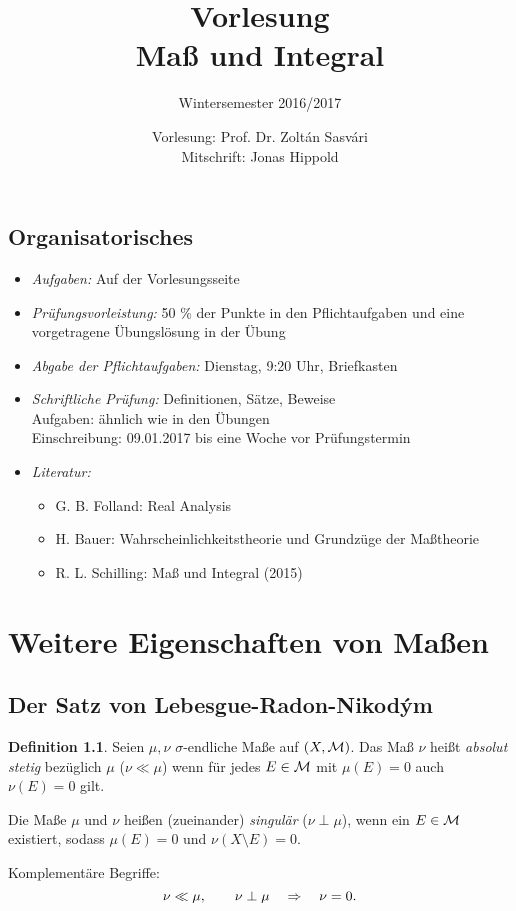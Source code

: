 \documentclass[
 a4paper,
 12pt,
 parskip=half
 ]{scrreprt}
\title{Vorlesung\\Maß und Integral}
\subtitle{Wintersemester 2016/2017}
\author{Vorlesung: Prof. Dr. Zoltán Sasvári\\Mitschrift: Jonas Hippold}
\theoremstyle{plain}
\theoremstyle{definition}
\newtheorem{defn}[thm]{Definition}
\numberwithin{equation}{section}
\begin{document}
\maketitle

\tableofcontents

\clearpage

\section*{Organisatorisches}
 \begin{itemize}
  \item \emph{Aufgaben:} Auf der Vorlesungsseite
  \item \emph{Prüfungsvorleistung:} 50 \% der Punkte in den Pflichtaufgaben und eine vorgetragene Übungslösung in der Übung
  \item \emph{Abgabe der Pflichtaufgaben:} Dienstag, 9:20 Uhr, Briefkasten 
  \item \emph{Schriftliche Prüfung:} Definitionen, Sätze, Beweise \\
   Aufgaben: ähnlich wie in den Übungen \\
   Einschreibung: 09.01.2017 bis eine Woche vor Prüfungstermin
  \item \emph{Literatur:}
   \begin{itemize}
    \item G. B. Folland: Real Analysis
    \item H. Bauer: Wahrscheinlichkeitstheorie und Grundzüge der Maßtheorie
    \item R. L. Schilling: Maß und Integral (2015)
   \end{itemize}
 \end{itemize}



\clearpage



\clearpage

\chapter{Weitere Eigenschaften von Maßen}
\section{Der Satz von Lebesgue-Radon-Nikod\'{y}m}
\begin{defn}
  Seien $\mu, \nu$ $\sigma$-endliche Maße auf $(X,\mathcal{M})$. Das Maß $\nu$ heißt
  \emph{absolut stetig} bezüglich $\mu$ ($\nu \ll \mu$) wenn für jedes $E \in
  \mathcal{M}$ mit $\mu(E) = 0$ auch $\nu(E) = 0$ gilt.

  Die Maße $\mu$ und $\nu$ heißen (zueinander) \emph{singulär} ($\nu \perp \mu$), wenn ein $E \in
  \mathcal{M}$ existiert, sodass $\mu(E) = 0$ und $\nu(X \setminus E) = 0$.

  Komplementäre Begriffe:
  \[ \nu \ll \mu, \qquad \nu \perp \mu \quad \Rightarrow \quad \nu = 0. \]
\end{defn}
\end{document}
